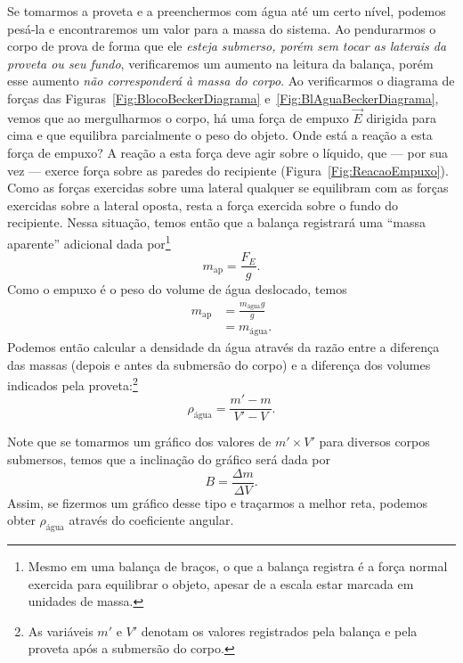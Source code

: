 Se tomarmos a proveta e a preenchermos com água até um certo nível, podemos pesá-la e encontraremos um valor para a massa do sistema. Ao pendurarmos o corpo de prova de forma que ele \emph{esteja submerso, porém sem tocar as laterais da proveta ou seu fundo}, verificaremos um aumento na leitura da balança, porém esse aumento \emph{não corresponderá à massa do corpo}. Ao verificarmos o diagrama de forças das Figuras~\ref{Fig:BlocoBeckerDiagrama} e~\ref{Fig:BlAguaBeckerDiagrama}, vemos que ao mergulharmos o corpo, há uma força de empuxo $\vec{E}$ dirigida para cima e que equilibra parcialmente o peso do objeto. Onde está a reação a esta força de empuxo? A reação a esta força deve agir sobre o líquido, que --- por sua vez --- exerce força sobre as paredes do recipiente (Figura~\ref{Fig:ReacaoEmpuxo}). Como as forças exercidas sobre uma lateral qualquer se equilibram com as forças exercidas sobre a lateral oposta, resta a força exercida sobre o fundo do recipiente. Nessa situação, temos então que a balança registrará uma ``massa aparente'' adicional dada por\footnote{Mesmo em uma balança de braços, o que a balança registra é a força normal exercida para equilibrar o objeto, apesar de a escala estar marcada em unidades de massa.}
\begin{equation}
	m_{\textrm{ap}} = \frac{F_E}{g}.
\end{equation}
%
Como o empuxo é o peso do volume de água deslocado, temos
\begin{align}
	m_{\textrm{ap}} &= \frac{m_{\textrm{água}}g}{g} \\
	&=m_{\textrm{água}}.
\end{align}
%
Podemos então calcular a densidade da água através da razão entre a diferença das massas (depois e antes da submersão do corpo) e a diferença dos volumes indicados pela proveta:\footnote{As variáveis $m'$ e $V'$ denotam os valores registrados pela balança e pela proveta após a submersão do corpo.}
\begin{equation}
	\rho_{\textrm{água}} = \frac{m'-m}{V'-V}.
\end{equation}

Note que se tomarmos um gráfico dos valores de $m'\times V'$ para diversos corpos submersos, temos que a inclinação do gráfico será dada por
\begin{equation}
    B = \frac{\Delta m}{\Delta V}.
\end{equation}
%
Assim, se fizermos um gráfico desse tipo e traçarmos a melhor reta, podemos obter $\rho_{\text{água}}$ através do coeficiente angular. 


